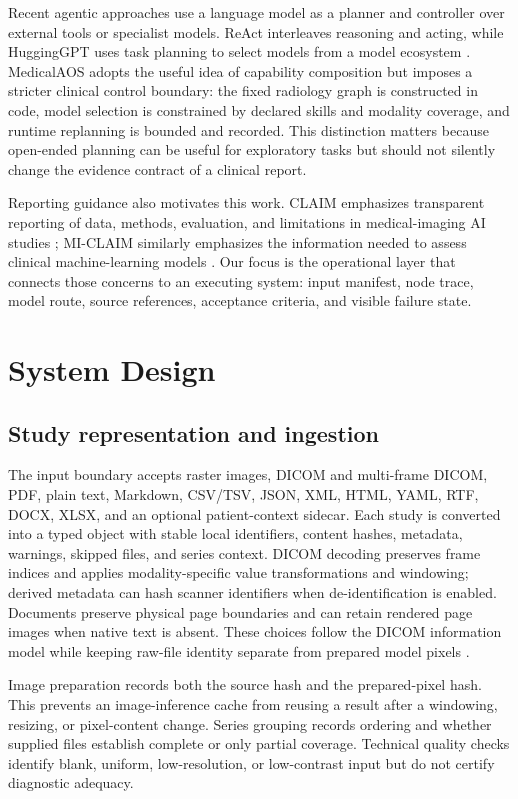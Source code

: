 \documentclass[a4paper,conference]{IEEEtran}
\begin{document}
Recent agentic approaches use a language model as a planner and controller over external tools or specialist models. ReAct interleaves reasoning and acting, while HuggingGPT uses task planning to select models from a model ecosystem \cite{yao2023react,shen2023hugginggpt}. MedicalAOS adopts the useful idea of capability composition but imposes a stricter clinical control boundary: the fixed radiology graph is constructed in code, model selection is constrained by declared skills and modality coverage, and runtime replanning is bounded and recorded. This distinction matters because open-ended planning can be useful for exploratory tasks but should not silently change the evidence contract of a clinical report.

Reporting guidance also motivates this work. CLAIM emphasizes transparent reporting of data, methods, evaluation, and limitations in medical-imaging AI studies \cite{mongan2020claim}; MI-CLAIM similarly emphasizes the information needed to assess clinical machine-learning models \cite{norgeot2020miclaim}. Our focus is the operational layer that connects those concerns to an executing system: input manifest, node trace, model route, source references, acceptance criteria, and visible failure state.

\section{System Design}
\subsection{Study representation and ingestion}
The input boundary accepts raster images, DICOM and multi-frame DICOM, PDF, plain text, Markdown, CSV/TSV, JSON, XML, HTML, YAML, RTF, DOCX, XLSX, and an optional patient-context sidecar. Each study is converted into a typed object with stable local identifiers, content hashes, metadata, warnings, skipped files, and series context. DICOM decoding preserves frame indices and applies modality-specific value transformations and windowing; derived metadata can hash scanner identifiers when de-identification is enabled. Documents preserve physical page boundaries and can retain rendered page images when native text is absent. These choices follow the DICOM information model while keeping raw-file identity separate from prepared model pixels \cite{dicom2025}.

Image preparation records both the source hash and the prepared-pixel hash. This prevents an image-inference cache from reusing a result after a windowing, resizing, or pixel-content change. Series grouping records ordering and whether supplied files establish complete or only partial coverage. Technical quality checks identify blank, uniform, low-resolution, or low-contrast input but do not certify diagnostic adequacy.
\end{document}
